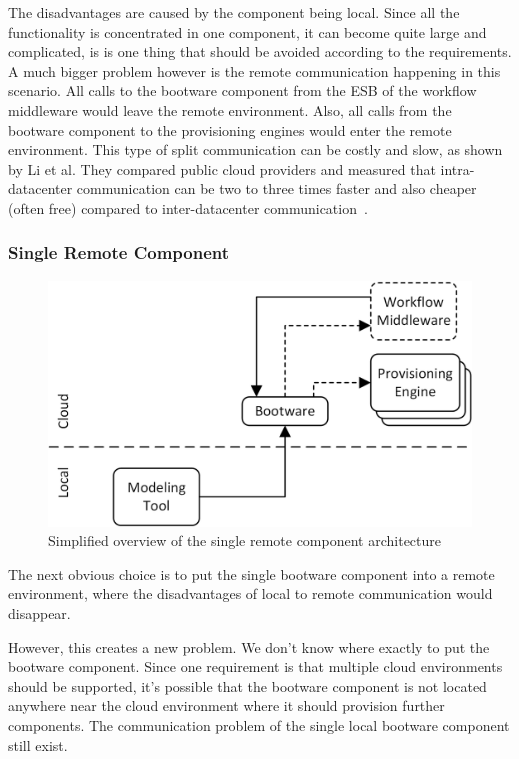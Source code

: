The disadvantages are caused by the component being local.
Since all the functionality is concentrated in one component, it can become quite large and complicated, is is one thing that should be avoided according to the requirements.
A much bigger problem however is the remote communication happening in this scenario.
All calls to the bootware component from the ESB of the workflow middleware would leave the remote environment.
Also, all calls from the bootware component to the provisioning engines would enter the remote environment.
This type of split communication can be costly and slow, as shown by Li et al.
They compared public cloud providers and measured that intra-datacenter communication can be two to three times faster and also cheaper (often free) compared to inter-datacenter communication~\autocite{cloudcmp}.

\subsubsection{Single Remote Component}

\begin{figure}[!htbp]
	\centering
	\includegraphics[resolution=600]{design/assets/simple_remote}
	\caption{Simplified overview of the single remote component architecture}
	\label{image:single_remote}
\end{figure}

The next obvious choice is to put the single bootware component into a remote environment, where the disadvantages of local to remote communication would disappear.

However, this creates a new problem.
We don't know where exactly to put the bootware component.
Since one requirement is that multiple cloud environments should be supported, it's possible that the bootware component is not located anywhere near the cloud environment where it should provision further components.
The communication problem of the single local bootware component still exist.

